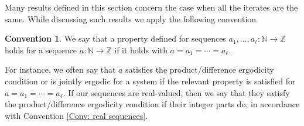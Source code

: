 \documentclass[11pt]{amsart}
\theoremstyle{definition}
\newtheorem{convention}{Convention}
\DeclareMathOperator*{\E}{\mathbb{E}}
\newcommand{\N}{{\mathbb N}}
\newcommand{\Z}{{\mathbb Z}}
\newcommand{\CX}{{\mathcal X}}
\newcommand{\1}{{\mathbf{1}}}
\begin{document}
    Many results defined in this section concern the case when all the iterates are the same. While discussing such results    
    we apply the following convention.
    \begin{convention}
        We say that a property defined for sequences $a_1, \ldots, a_\ell:\N\to\Z$ holds for a sequence $a:\N\to\Z$ if it holds with $a = a_1 = \cdots = a_\ell$.
    \end{convention}
    For instance, we often say 
    that $a$ satisfies the product/difference ergodicity condition or is jointly ergodic for a system if the relevant property is satisfied for $a=a_1 = \cdots = a_\ell$. If our sequences are real-valued, then we say that they satisfy the product/difference ergodicity condition if their integer parts do, in accordance with Convention \ref{Conv: real sequences}.
\end{document}
